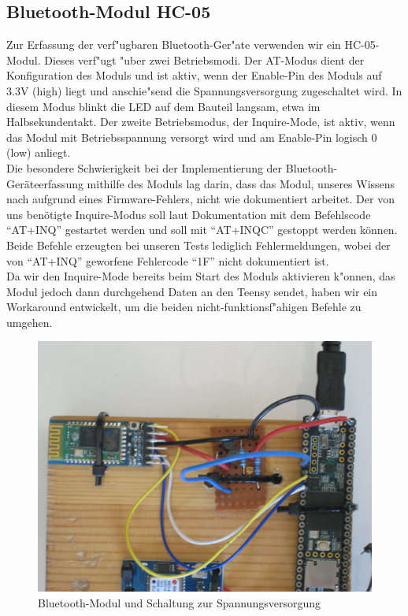 \documentclass[a4paper,11pt, ngerman]{scrartcl}
\begin{document}
\subsection{Bluetooth-Modul HC-05}
Zur Erfassung der verf"ugbaren Bluetooth-Ger"ate verwenden wir ein HC-05-Modul. Dieses verf"ugt "uber zwei Betriebsmodi. Der AT-Modus dient der Konfiguration des Moduls und ist aktiv, wenn der Enable-Pin des Moduls auf 3.3V (high) liegt und anschie"send die Spannungsversorgung zugeschaltet wird. In diesem Modus blinkt die LED auf dem Bauteil langsam, etwa im Halbsekundentakt. Der zweite Betriebsmodus, der Inquire-Mode, ist aktiv, wenn das Modul mit Betriebsspannung versorgt wird und am Enable-Pin logisch 0 (low) anliegt.\\
Die besondere Schwierigkeit bei der Implementierung der Bluetooth-Geräteerfassung mithilfe des Moduls lag darin, dass das Modul, unseres Wissens nach aufgrund eines Firmware-Fehlers, nicht wie dokumentiert arbeitet. Der von uns benötigte Inquire-Modus soll laut Dokumentation mit dem Befehlscode \enquote{AT+INQ} gestartet werden und soll mit \enquote{AT+INQC} gestoppt werden können. Beide Befehle erzeugten bei unseren Tests lediglich Fehlermeldungen, wobei der von \enquote{AT+INQ} geworfene Fehlercode \enquote{1F} nicht dokumentiert ist.\\
Da wir den Inquire-Mode bereits beim Start des Moduls aktivieren k"onnen, das Modul jedoch dann durchgehend Daten an den Teensy sendet, haben wir ein Workaround entwickelt, um die beiden nicht-funktionsf"ahigen Befehle zu umgehen.\\

\begin{figure}[H]
	\includegraphics[width=.95\linewidth]{BT.JPG}\caption{Bluetooth-Modul und Schaltung zur Spannungsversorgung}
\end{figure}
\end{document}
